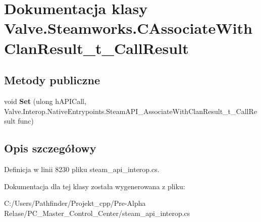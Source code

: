 \hypertarget{class_valve_1_1_steamworks_1_1_c_associate_with_clan_result__t___call_result}{}\section{Dokumentacja klasy Valve.\+Steamworks.\+C\+Associate\+With\+Clan\+Result\+\_\+t\+\_\+\+Call\+Result}
\label{class_valve_1_1_steamworks_1_1_c_associate_with_clan_result__t___call_result}
\subsection*{Metody publiczne}
\begin{DoxyCompactItemize}
\item 
\mbox{\label{class_valve_1_1_steamworks_1_1_c_associate_with_clan_result__t___call_result_a57ada88a362160c1e79fbb35a178daae}} 
void {\bfseries Set} (ulong h\+A\+P\+I\+Call, Valve.\+Interop.\+Native\+Entrypoints.\+Steam\+A\+P\+I\+\_\+\+Associate\+With\+Clan\+Result\+\_\+t\+\_\+\+Call\+Result func)
\end{DoxyCompactItemize}


\subsection{Opis szczegółowy}


Definicja w linii 8230 pliku steam\+\_\+api\+\_\+interop.\+cs.



Dokumentacja dla tej klasy została wygenerowana z pliku\+:\begin{DoxyCompactItemize}
\item 
C\+:/\+Users/\+Pathfinder/\+Projekt\+\_\+cpp/\+Pre-\/\+Alpha Relase/\+P\+C\+\_\+\+Master\+\_\+\+Control\+\_\+\+Center/steam\+\_\+api\+\_\+interop.\+cs\end{DoxyCompactItemize}
